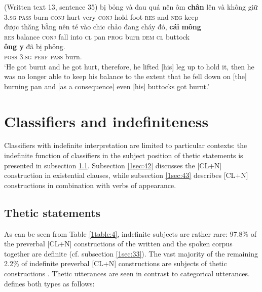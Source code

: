 \documentclass[output=paper]{langsci/langscibook}
\begin{document}
\begin{exe}
\ex\label{1ex:27}
(Written text 13, sentence 35)
\exi{}
  bị        bỏng  và         đau  quá   nên       ôm    {\textbf{chân}}  lên    và   không  giữ  \\
3.{\textsc{sg}}     {\textsc{pass}}  burn   {\textsc{conj}}  hurt  very  {\textsc{conj}}   hold  foot   {\textsc{res}}  and {\textsc{neg}}   keep \\
\glt
\exi{}
\gll được	 {thăng bằng}   nên      té   vào   chi{\dae}c chảo đang    cháy  đó,       {\textbf{cái}}   {\textbf{mông}} \\
{\textsc{res}}  balance          {\textsc{conj}}  fall into   {\textsc{cl}}    pan   {\textsc{prog}} burn   {\textsc{dem}}  {\textsc{cl}}  buttock \\
\exi{}
     {\textbf{ông {\daa}y}}  đã        bị        phỏng. \\
{\textsc{poss}} {\textsc{3.sg}}     {\textsc{perf}}  {\textsc{pass}}  burn.\\
\glt `He got burnt and he got hurt, therefore, he lifted [his] leg up to hold it, then he was no longer able to keep his balance to the extent that he fell down on [the] burning pan and [as a consequence] even [his] buttocks got burnt.'
\end{exe}


\section{Classifiers and indefiniteness}\label{sec:4}

Classifiers with indefinite interpretation are limited to particular contexts: the indefinite function of classifiers in the subject position of thetic statements is presented in subsection \ref{1sec:41}. Subsection \ref{1sec:42} discusses the [CL+N] construction in existential clauses, while subsection \ref{1sec:43} describes [CL+N] constructions in combination with verbs of appearance.

\subsection{Thetic statements}\label{1sec:41}

As can be seen from Table \ref{1table:4}, indefinite subjects are rather rare: 97.8\% of the preverbal [CL+N] constructions of the written and the spoken corpus together are definite (cf. subsection \ref{1sec:33}). The vast majority of the remaining 2.2\% of indefinite preverbal [CL+N] constructions are subjects of thetic constructions \citep{kuroda:72,sasse:87,sasse:95}. Thetic utterances are seen in contrast to categorical utterances. \cite{sasse:95} defines both types as follows:\\
\end{document}
